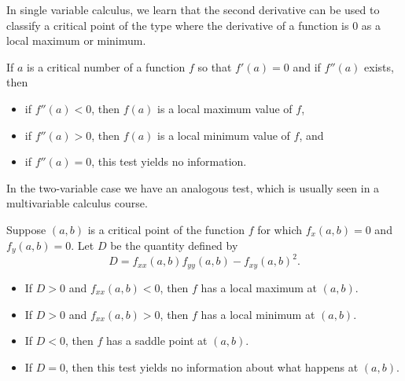  \label{sec:orthogonal_diagonalization}

\vspace*{-17 pt}

\vspace*{13 pt}


In single variable calculus, we learn that the second derivative can be used to classify a critical point of the type where the derivative of a function is 0 as a local maximum or minimum. 

\begin{theorem}  If $a$ is a critical number of a function $f$ so that $f'(a)=0$ and if $f''(a)$ exists, then 
\begin{itemize}
\item if $f''(a) < 0$, then $f(a)$ is a local maximum value of $f$,
\item if $f''(a) > 0$, then $f(a)$ is a local minimum value of $f$, and
\item if $f''(a) = 0$,  this test yields no information.
\end{itemize}
\end{theorem}

In the two-variable case we have an analogous test, which is usually seen in a multivariable calculus course. 

\begin{theorem} Suppose $(a,b)$ is a critical point of the function $f$ for which $f_x(a,b) = 0$ and
$f_y(a,b) = 0$.  Let $D$ be the quantity defined by
\[D = f_{xx}(a,b) f_{yy}(a,b) - f_{xy}(a,b)^2.\]
\begin{itemize}
\item If $D>0$ and $f_{xx}(a,b) < 0$, then $f$ has a local maximum at $(a,b)$.
\item If $D>0$ and $f_{xx}(a,b) > 0$, then $f$ has a local minimum at $(a,b)$.
\item If $D < 0$, then $f$ has a saddle point at $(a,b)$.
\item If $D = 0$, then this test yields no information about what happens at $(a,b)$.
\end{itemize}
\end{theorem}

